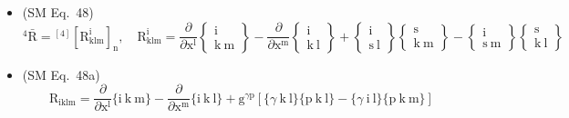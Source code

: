 \documentclass[
    12pt,              %
    a4paper,           %
    headings=normal,   %
    twoside=true,      %
    BCOR=8mm,          %
]{scrbook}
\begin{document}
\begin{itemize}[label={},leftmargin=0pt]
    \item (SM Eq.\ 48) 
    \[
    {}^4\bar{\mathrm{R}} = {}^{[4]}\left[ \mathrm{R}^\mathrm{i}_{\mathrm{klm}} \right]_\mathrm{n}, \quad \mathrm{R}^\mathrm{i}_{\mathrm{klm}} = \frac{\partial}{\partial \mathrm{x^l}}\left\{ \begin{smallmatrix} \mathrm{i} \\ \mathrm{k\ m} \end{smallmatrix} \right\} - \frac{\partial}{\partial \mathrm{x^m}}\left\{ \begin{smallmatrix} \mathrm{i} \\ \mathrm{k\ l} \end{smallmatrix} \right\} + \left\{ \begin{smallmatrix} \mathrm{i} \\ \mathrm{s\ l} \end{smallmatrix} \right\}\left\{ \begin{smallmatrix} \mathrm{s} \\ \mathrm{k\ m} \end{smallmatrix} \right\} - \left\{ \begin{smallmatrix} \mathrm{i} \\ \mathrm{s\ m} \end{smallmatrix} \right\}\left\{ \begin{smallmatrix} \mathrm{s} \\ \mathrm{k\ l} \end{smallmatrix} \right\}
    \]

    \item (SM Eq.\ 48a) 
    \[
    \mathrm{R}_{\mathrm{iklm}} = \frac{\partial}{\partial \mathrm{x^l}}\{ \mathrm{i\ k\ m} \} - \frac{\partial}{\partial \mathrm{x^m}}\{ \mathrm{i\ k\ l} \} + \mathrm{g}^{\gamma\mathrm{p}} \left[ \{ \gamma\ \mathrm{k\ l} \}\{ \mathrm{p\ k\ l} \} - \{ \gamma\ \mathrm{i\ l} \}\{ \mathrm{p\ k\ m} \} \right]
    \]


\end{itemize}
\end{document}
